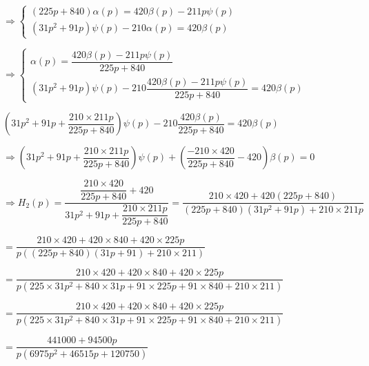 \begin{multicols}{2}
\begin{corrige}
$
\Rightarrow \left\{
\begin{array}{l}
\left(225p+840\right)\alpha(p)=420\beta(p) - 211 p {\psi}(p)\\
\left(31p^2+91p\right){\psi}(p)-210\alpha(p)=420\beta(p) 
\end{array}
\right. $

$
\Rightarrow \left\{
\begin{array}{l}
\alpha(p)=\dfrac{420\beta(p) - 211 p {\psi}(p)}{225p+840}\\
\left(31p^2+91p\right){\psi}(p)-210\dfrac{420\beta(p) - 211 p {\psi}(p)}{225p+840}=420\beta(p) 
\end{array}
\right. $

$\left(31p^2+91p + \dfrac{210\times 211p}{225p+840}\right){\psi}(p)-210\dfrac{420\beta(p)}{225p+840}=420\beta(p) $

$\Rightarrow \left(31p^2+91p + \dfrac{210\times 211p}{225p+840}\right){\psi}(p)+\left(\dfrac{-210\times 420}{225p+840}-420\right)\beta(p)=0 $

$\Rightarrow H_2(p) = \dfrac{\dfrac{210\times 420}{225p+840}+420}{31p^2+91p + \dfrac{210\times 211p}{225p+840}} 
 = \dfrac{210\times 420+420\left(225p+840\right)}{\left(225p+840\right)\left(31p^2+91p \right)+ 210\times 211p}   $

$ = \dfrac{210\times 420+420\times 840+420\times 225p}{p\left(\left(225p+840\right)\left(31p+91 \right)+ 210\times 211\right)}   $


$ = \dfrac{210\times 420+420\times 840+420\times 225p}{p\left(225\times 31 p^2 
+840\times 31 p + 91 \times 225 p+91\times 840 + 210\times 211\right)}   $

$ = \dfrac{210\times 420+420\times 840+420\times 225p}{p\left(225\times 31 p^2 
+840\times 31 p + 91 \times 225 p+91\times 840 + 210\times 211\right)}   $

$ = \dfrac{441000+94500p}{p\left(6975  p^2 
+46515 p+120750\right)}   $
\end{corrige}
\else
\fi




\ifprof
\else
\end{multicols}
\fi



